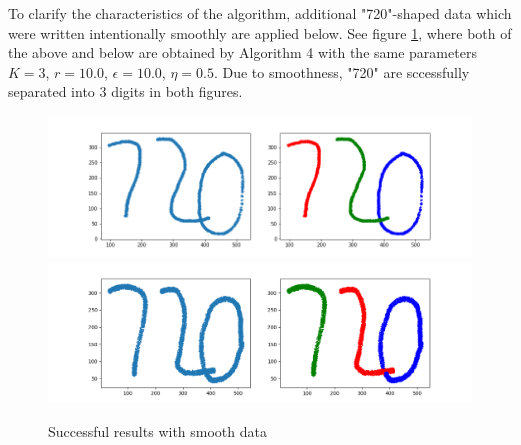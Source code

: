 \documentclass[twoside,11pt]{article}
\begin{document}
To clarify the characteristics of the algorithm, additional "720"-shaped data which were written intentionally smoothly are applied below.  See figure \ref{fig3}, where both of the above and below are obtained by Algorithm 4 with the same parameters $K = 3$, $r = 10.0$, $\epsilon = 10.0$, $\eta = 0.5$. Due to smoothness, "720" are sccessfully separated into 3 digits in both figures.

\begin{figure}[htbp]
\centering
\vspace{-1em}
\includegraphics[width=1.0  \textwidth]{smooth_720_1.png}
\includegraphics[width=1.0  \textwidth]{smooth_720_2.png}
\vspace{-2em}
\caption{Successful results with smooth data}
\label{fig3}
\end{figure}
\end{document}
